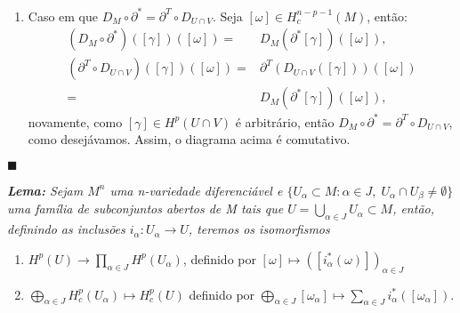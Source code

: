 \documentclass{article}
\newcommand{\cohomologia}[2]{H^{#1}(#2)}
\newcommand{\cohomologiacompac}[2]{H^{#1}_{c}(#2)}
\begin{document}
\begin{enumerate}
	\item Caso em que $D_{M} \circ \partial^{*} = \partial^{T} \circ D_{U \cap V}$. Seja $[\omega] \in H^{n-p-1}_{c}(M)$, então:
		$$
		\begin{aligned}
		(D_{M} \circ \partial^{*} )([\gamma])([\omega]) =& D_{M}(\partial^{*} [\gamma])([\omega]),
		\\
		(\partial^{T} \circ D_{U \cap V} )([\gamma])([\omega])
		=& \partial^{T}(D_{U \cap V} ([\gamma]))([\omega])
		\\
		=& D_{M}(\partial^{*} [\gamma])([\omega]),
		\end{aligned}
		$$
		novamente, como $[\gamma] \in H^{p}(U \cap V)$ é arbitrário, então $D_{M} \circ \partial^{*} = \partial^{T} \circ D_{U \cap V}$, como desejávamos. Assim, o diagrama acima é comutativo.
	\end{enumerate}
	
	$\blacksquare$
	
	\vspace{2mm}
	\textit{\textbf{Lema:} Sejam $M^{n}$ uma n-variedade diferenciável e  $\{U_{\alpha} \subset M: \alpha \in J, \; U_{\alpha} \cap U_{\beta} \neq \emptyset \}$ uma família de subconjuntos abertos de M tais que $U = \bigcup_{\alpha \in J}U_{\alpha} \subset M$, então, definindo as inclusões $i_{\alpha}:U_{\alpha} \to U$, teremos os isomorfismos}
	\begin{enumerate}
		\item $\cohomologia{p}{U} \to \prod_{\alpha \in J} \cohomologia{p}{U_{\alpha}}$, definido por $[\omega] \mapsto ([i^{*}_{\alpha}(\omega)])_{\alpha \in J}$
		
		\item $\bigoplus_{\alpha \in J} \cohomologiacompac{p}{U_{\alpha}} \mapsto \cohomologiacompac{p}{U}$ definido por $\bigoplus_{\alpha \in J}[\omega_{\alpha}] \mapsto \sum_{\alpha \in J} i^{*}_{\alpha}([\omega_{\alpha}])$.
	\end{enumerate}
	
\end{document}
